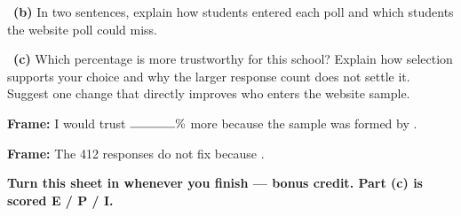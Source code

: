 \documentclass[11pt]{article}
\begin{document}
~\textbf{(b)} In two sentences, explain how students entered each poll and which students the website poll could miss.\par
\workspace{1.4in}

~\textbf{(c)} Which percentage is more trustworthy for this school? Explain how selection supports your choice and why the larger response count does not settle it. Suggest one change that directly improves who enters the website sample.\par
\workspace{2.0in}

\begin{sentenceframebox}\raggedright\textbf{Frame:} I would trust $\blank[0.5in]\%$ more because the sample was formed by \blank[2.2in].\end{sentenceframebox}

\begin{sentenceframebox}\raggedright\textbf{Frame:} The 412 responses do not fix \blank[1.4in] because \blank[2.3in].\end{sentenceframebox}

\textbf{Turn this sheet in whenever you finish --- bonus credit. Part (c) is scored E / P / I.}\par
\end{document}
